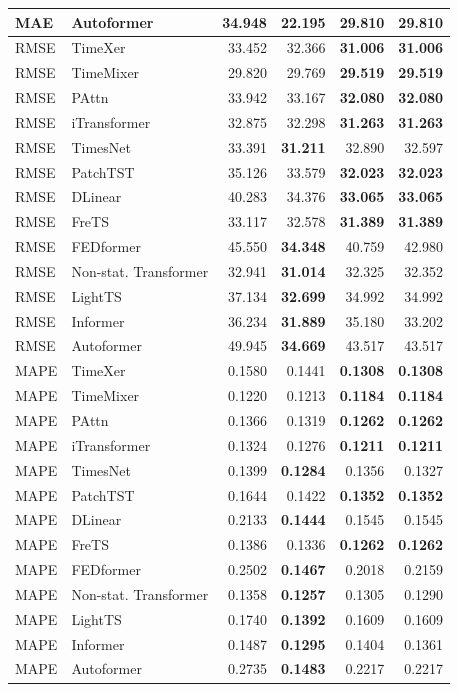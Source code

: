 \begin{longtable}{llrrrr}
MAE & Autoformer & 34.948 & \textbf{22.195} & 29.810 & 29.810 \\
\midrule
RMSE & TimeXer & 33.452 & 32.366 & \textbf{31.006} & \textbf{31.006} \\
RMSE & TimeMixer & 29.820 & 29.769 & \textbf{29.519} & \textbf{29.519} \\
RMSE & PAttn & 33.942 & 33.167 & \textbf{32.080} & \textbf{32.080} \\
RMSE & iTransformer & 32.875 & 32.298 & \textbf{31.263} & \textbf{31.263} \\
RMSE & TimesNet & 33.391 & \textbf{31.211} & 32.890 & 32.597 \\
RMSE & PatchTST & 35.126 & 33.579 & \textbf{32.023} & \textbf{32.023} \\
RMSE & DLinear & 40.283 & 34.376 & \textbf{33.065} & \textbf{33.065} \\
RMSE & FreTS & 33.117 & 32.578 & \textbf{31.389} & \textbf{31.389} \\
RMSE & FEDformer & 45.550 & \textbf{34.348} & 40.759 & 42.980 \\
RMSE & Non-stat. Transformer & 32.941 & \textbf{31.014} & 32.325 & 32.352 \\
RMSE & LightTS & 37.134 & \textbf{32.699} & 34.992 & 34.992 \\
RMSE & Informer & 36.234 & \textbf{31.889} & 35.180 & 33.202 \\
RMSE & Autoformer & 49.945 & \textbf{34.669} & 43.517 & 43.517 \\
\midrule
MAPE & TimeXer & 0.1580 & 0.1441 & \textbf{0.1308} & \textbf{0.1308} \\
MAPE & TimeMixer & 0.1220 & 0.1213 & \textbf{0.1184} & \textbf{0.1184} \\
MAPE & PAttn & 0.1366 & 0.1319 & \textbf{0.1262} & \textbf{0.1262} \\
MAPE & iTransformer & 0.1324 & 0.1276 & \textbf{0.1211} & \textbf{0.1211} \\
MAPE & TimesNet & 0.1399 & \textbf{0.1284} & 0.1356 & 0.1327 \\
MAPE & PatchTST & 0.1644 & 0.1422 & \textbf{0.1352} & \textbf{0.1352} \\
MAPE & DLinear & 0.2133 & \textbf{0.1444} & 0.1545 & 0.1545 \\
MAPE & FreTS & 0.1386 & 0.1336 & \textbf{0.1262} & \textbf{0.1262} \\
MAPE & FEDformer & 0.2502 & \textbf{0.1467} & 0.2018 & 0.2159 \\
MAPE & Non-stat. Transformer & 0.1358 & \textbf{0.1257} & 0.1305 & 0.1290 \\
MAPE & LightTS & 0.1740 & \textbf{0.1392} & 0.1609 & 0.1609 \\
MAPE & Informer & 0.1487 & \textbf{0.1295} & 0.1404 & 0.1361 \\
MAPE & Autoformer & 0.2735 & \textbf{0.1483} & 0.2217 & 0.2217 \\
\end{longtable}
\endgroup

